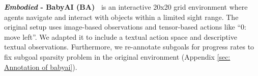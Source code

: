 \textbf{\textit{Embodied} - BabyAI (BA)~\citep{chevalier2018babyai}}
is an interactive 20x20 grid environment where agents navigate and interact with objects within a limited sight range. 
The original setup uses image-based observations and tensor-based actions like “0: move left”. We adapted it to include a textual action space and descriptive textual observations.
Furthermore, we re-annotate subgoals for progress rates to fix subgoal sparsity problem  in the original environment (Appendix \ref{sec: Annotation of babyai}).


 




